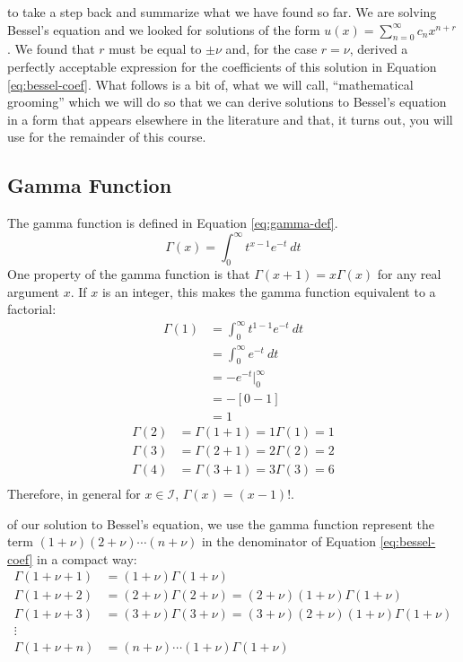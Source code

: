  to take a step back and summarize what we have found so far.  We are solving Bessel's equation and we looked for solutions of the form $u(x)=\sum_{n=0}^{\infty} c_n x^{n+r}$.  We found that $r$ must be equal to $\pm \nu$ and, for the case $r = \nu$, derived a perfectly acceptable expression for the coefficients of this solution in Equation \ref{eq:bessel-coef}. What follows is a bit of, what we will call, ``mathematical grooming'' which we will do so that we can derive solutions to Bessel's equation in a form that appears elsewhere in the literature and that, it turns out, you will use for the remainder of this course.
\subsection{Gamma Function}
The gamma function is defined in Equation \ref{eq:gamma-def}.
\begin{equation}
\Gamma(x) = \int_0^{\infty} t^{x-1}e^{-t} \ dt
\label{eq:gamma-def}
\end{equation}
One property of the gamma function is that $\Gamma(x+1) = x \Gamma(x)$ for any real argument $x$. If $x$ is an integer, this makes the gamma function equivalent to a factorial: 
\begin{align*}
\Gamma(1) &= \int_0^{\infty}t^{1-1} e^{-t} \ dt \\
&= \int_0^{\infty}e^{-t} \ dt \\
&= -e^{-t}\Bigr|_0^{\infty} \\
&= -[0 - 1] \\
&= 1
\end{align*}
\begin{align*}
\Gamma(2) &= \Gamma(1+1) = 1\Gamma(1) = 1 \\
\Gamma(3) &= \Gamma(2+1) = 2\Gamma(2) = 2 \\
\Gamma(4) &= \Gamma(3+1) = 3\Gamma(3) = 6 \\
\end{align*}
Therefore, in general for $x \in \mathcal{I}$, $\Gamma(x) = (x-1)!$. 

 of our solution to Bessel's equation, we use the gamma function represent the term $(1+\nu)(2+\nu)\cdots(n+\nu)$ in the denominator of Equation \ref{eq:bessel-coef} in a compact way:
\begin{align*}
\Gamma(1+\nu+1) &= (1+\nu)\Gamma(1+\nu) \\
\Gamma(1+\nu+2) &= (2+\nu)\Gamma(2+\nu) = (2+\nu)(1+\nu)\Gamma(1+\nu) \\
\Gamma(1+\nu+3) &= (3+\nu)\Gamma(3+\nu) = (3+\nu)(2+\nu)(1+\nu)\Gamma(1+\nu) \\
\vdots \\
\Gamma(1+\nu+n) &= (n+\nu)\cdots(1+\nu)\Gamma(1+\nu)
\end{align*}

